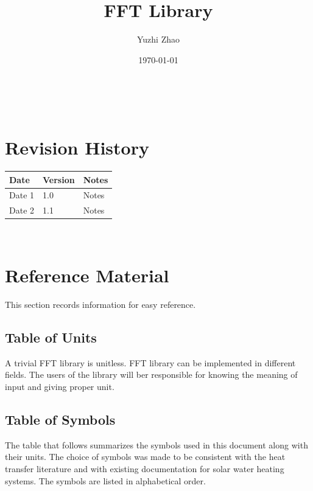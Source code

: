 \documentclass[12pt]{article}
\begin{document}
\title{FFT Library} \author{Yuzhi Zhao} \date{\today} \maketitle

\newpage

\tableofcontents

~\newpage


\section{Revision History}

\begin{tabularx}{\textwidth}{p{3cm}p{2cm}X} \toprule {\bf Date} & {\bf Version}
& {\bf Notes}\\ \midrule Date 1 & 1.0 & Notes\\ Date 2 & 1.1 & Notes\\
\bottomrule \end{tabularx}

~\newpage
	
\section{Reference Material}

This section records information for easy reference.

\subsection{Table of Units}
A trivial FFT library is unitless. FFT library can be implemented in different fields. The users of the library will ber responsible for knowing the meaning of input and giving proper unit.

\subsection{Table of Symbols}

The table that follows summarizes the symbols used in this document along with
their units. The choice of symbols was made to be consistent with the heat
transfer literature and with existing documentation for solar water heating
systems. The symbols are listed in alphabetical order.

\renewcommand{\arraystretch}{1.2}
\end{document}
